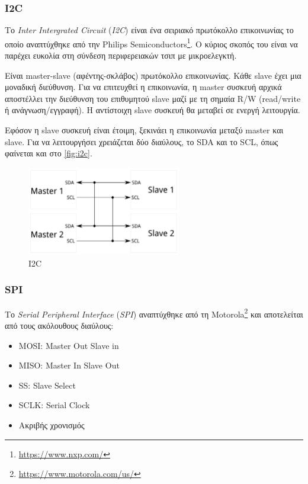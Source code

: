 \subsubsection{I2C}
\label{subsubsec:i2c}

Το \textit{Inter Intergrated Circuit} (\textit{I2C}) είναι ένα σειριακό πρωτόκολλο επικοινωνίας το οποίο αναπτύχθηκε από την Philips Semiconductors\footnote{\url{https://www.nxp.com/}}. Ο κύριος σκοπός του είναι να παρέχει ευκολία στη σύνδεση περιφερειακών τσιπ με μικροελεγκτή. 

Είναι master-slave (αφέντης-σκλάβος) πρωτόκολλο επικοινωνίας. Κάθε slave έχει μια μοναδική διεύθυνση. Για να επιτευχθεί η επικοινωνία, η master συσκευή αρχικά αποστέλλει την διεύθυνση του επιθυμητού slave μαζί με τη σημαία R/W (read/write ή ανάγνωση/εγγραφή). Η αντίστοιχη slave συσκευή θα μεταβεί σε ενεργή λειτουργία.

Εφόσον η slave συσκευή είναι έτοιμη, ξεκινάει η επικοινωνία μεταξύ master και slave. Για να λειτουργήσει χρειάζεται δύο διαύλους, το SDA και το SCL, όπως φαίνεται και στο \autoref{fig:i2c}.

\begin{figure}[!ht]
	\centering
	\includegraphics[width=0.6\textwidth]{./images/chapter2/i2c.png}
	\caption{I2C}
	\label{fig:i2c}
\end{figure}

\subsubsection{SPI}
\label{subsubsec:SPI}

Το \textit{Serial Peripheral Interface} (\textit{SPI}) αναπτύχθηκε από τη Motorola\footnote{\url{https://www.motorola.com/us/}} και αποτελείται από τους ακόλουθους διαύλους:

\begin{itemize}
	\item MOSI: Master Out Slave in
	\item MISO: Master In Slave Out
	\item SS: Slave Select
	\item SCLK: Serial Clock
	\item Ακριβής χρονισμός
\end{itemize}

